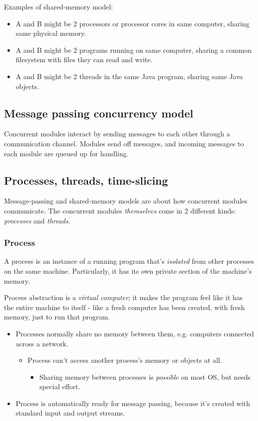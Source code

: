 \documentclass[10pt]{amsart}
\begin{document}
\begin{multicols*}{2}
Examples of shared-memory model:
\begin{itemize}
	\item A and B might be 2 processors or processor cores in same computer, sharing same physical memory.
	\item A and B might be 2 programs running on same computer, sharing a common filesystem with files they can read and write.
	\item A and B might be 2 threads in the same Java program, sharing same Java objects.
\end{itemize}

\subsection{Message passing concurrency model}

Concurrent modules interact by sending messages to each other through a communication channel. Modules send off messages, and incoming messages to each module are queued up for handling.

\subsection{Processes, threads, time-slicing}

Message-passing and shared-memory models are about how concurrent modules communicate. The concurrent modules \emph{themselves} come in 2 different kinds: \emph{processes} and \emph{threads}. \\

\subsubsection{Process}

A process is an instance of a running program that's \emph{isolated} from other processes on the same machine. Particularly, it has its own private section of the machine's memory.

Process abstraction is a \emph{virtual computer}; it makes the program feel like it has the entire machine to itself - like a fresh computer has been created, with fresh memory, just to run that program.

\begin{itemize} 
\item Processes normally share no memory between them, e.g. computers connected across a network.
\begin{itemize} 
\item Process can't access another process's memory or objects at all. \\
\begin{itemize}
	\item Sharing memory between processes is \emph{possible} on most OS, but needs special effort.
\end{itemize}
\end{itemize} 
\item Process is automatically ready for message passing, because it's created with standard input and output streams.
\end{itemize}


\end{multicols*}
\end{document}
